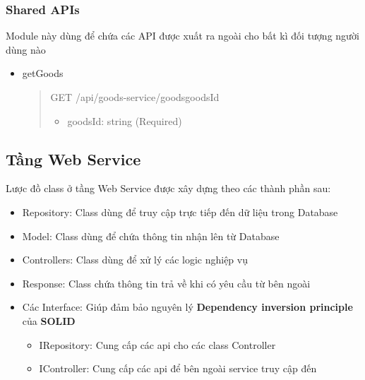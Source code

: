 \subsubsection{Shared APIs}
Module này dùng để chứa các API được xuất ra ngoài cho bất kì đối tượng người dùng nào

\begin{itemize}
	\item getGoods
	      \begin{quote}
		      GET /api/goods-service/goods{goodsId}
		      \begin{itemize}
			      \item goodsId: string (Required)
		      \end{itemize}
	      \end{quote}
\end{itemize}



\subsection{Tầng Web Service}
 
Lược đồ class ở tầng Web Service được xây dựng theo các thành phần sau:
\begin{itemize}
    \item Repository: Class dùng để truy cập trực tiếp đến dữ liệu trong Database
    \item Model: Class dùng để chứa thông tin nhận lên từ Database
    \item Controllers: Class dùng để xử lý các logic nghiệp vụ
    \item Response: Class chứa thông tin trả về khi có yêu cầu từ bên ngoài
    \item Các Interface: Giúp đảm bảo nguyên lý \textbf{Dependency inversion principle} của \textbf{SOLID}
    \begin {itemize}
        \item IRepository: Cung cấp các api cho các class Controller
        \item IController: Cung cấp các api để bên ngoài service truy cập đến
    \end{itemize}
\end{itemize}

\newpage

